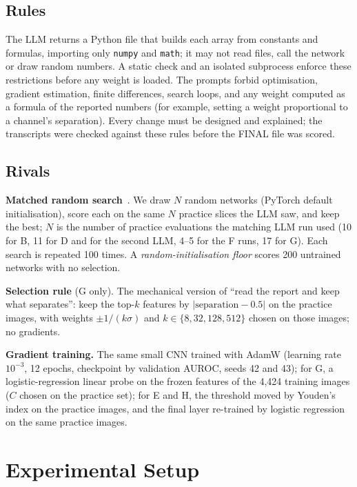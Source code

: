 \documentclass[runningheads]{llncs}
\begin{document}
\subsection{Rules}
The LLM returns a Python file that builds each array from constants and formulas, importing only \texttt{numpy} and \texttt{math}; it may not read files, call the network or draw random numbers.
A static check and an isolated subprocess enforce these restrictions before any weight is loaded.
The prompts forbid optimisation, gradient estimation, finite differences, search loops, and any weight computed as a formula of the reported numbers (for example, setting a weight proportional to a channel's separation).
Every change must be designed and explained; the transcripts were checked against these rules before the FINAL file was scored.

\subsection{Rivals}
\noindent\textbf{Matched random search}~\cite{bergstra2012}.
We draw $N$ random networks (PyTorch default initialisation), score each on the same $N$ practice slices the LLM saw, and keep the best; $N$ is the number of practice evaluations the matching LLM run used (10 for B, 11 for D and for the second LLM, 4--5 for the F runs, 17 for G).
Each search is repeated 100 times.
A \emph{random-initialisation floor} scores 200 untrained networks with no selection.

\noindent\textbf{Selection rule} (G only).
The mechanical version of ``read the report and keep what separates'': keep the top-$k$ features by $|\text{separation}-0.5|$ on the practice images, with weights $\pm1/(k\sigma)$ and $k\in\{8,32,128,512\}$ chosen on those images; no gradients.

\noindent\textbf{Gradient training.}
The same small CNN trained with AdamW (learning rate $10^{-3}$, 12 epochs, checkpoint by validation AUROC, seeds 42 and 43); for G, a logistic-regression linear probe on the frozen features of the 4,424 training images ($C$ chosen on the practice set); for E and H, the threshold moved by Youden's index on the practice images, and the final layer re-trained by logistic regression on the same practice images.

\section{Experimental Setup}
\end{document}
